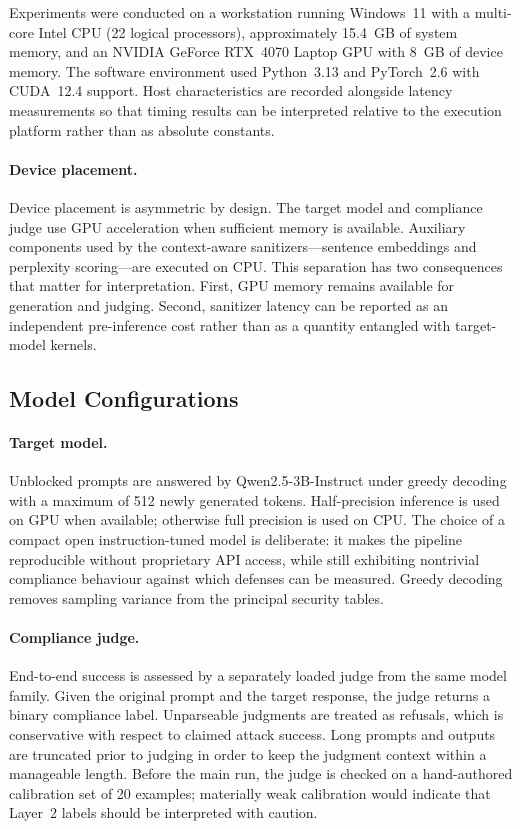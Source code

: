 Experiments were conducted on a workstation running Windows~11 with a multi-core Intel CPU (22 logical processors), approximately 15.4~GB of system memory, and an NVIDIA GeForce RTX~4070 Laptop GPU with 8~GB of device memory.
The software environment used Python~3.13 and PyTorch~2.6 with CUDA~12.4 support.
Host characteristics are recorded alongside latency measurements so that timing results can be interpreted relative to the execution platform rather than as absolute constants.

\paragraph{Device placement.}
Device placement is asymmetric by design.
The target model and compliance judge use GPU acceleration when sufficient memory is available.
Auxiliary components used by the context-aware sanitizers---sentence embeddings and perplexity scoring---are executed on CPU.
This separation has two consequences that matter for interpretation.
First, GPU memory remains available for generation and judging.
Second, sanitizer latency can be reported as an independent pre-inference cost rather than as a quantity entangled with target-model kernels.

\subsection{Model Configurations}
\label{sec:models-setup}

\paragraph{Target model.}
Unblocked prompts are answered by Qwen2.5-3B-Instruct under greedy decoding with a maximum of 512 newly generated tokens.
Half-precision inference is used on GPU when available; otherwise full precision is used on CPU.
The choice of a compact open instruction-tuned model is deliberate: it makes the pipeline reproducible without proprietary API access, while still exhibiting nontrivial compliance behaviour against which defenses can be measured.
Greedy decoding removes sampling variance from the principal security tables.

\paragraph{Compliance judge.}
End-to-end success is assessed by a separately loaded judge from the same model family.
Given the original prompt and the target response, the judge returns a binary compliance label.
Unparseable judgments are treated as refusals, which is conservative with respect to claimed attack success.
Long prompts and outputs are truncated prior to judging in order to keep the judgment context within a manageable length.
Before the main run, the judge is checked on a hand-authored calibration set of 20 examples; materially weak calibration would indicate that Layer~2 labels should be interpreted with caution.

